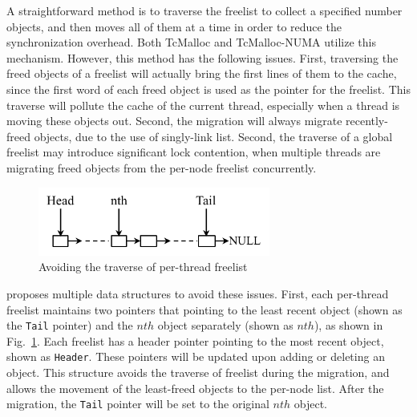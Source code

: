 
A straightforward method is to traverse the freelist to collect a specified number objects, and then moves all of them at a time in order to reduce the synchronization overhead. Both TcMalloc and TcMalloc-NUMA utilize this mechanism. However, this method has the following issues. First, traversing the freed objects of a freelist will actually bring the first lines of them to the cache, since the first word of each freed object is used as the pointer for the freelist. This traverse will pollute the cache of the current thread, especially when a thread is moving these objects out. 
Second, the migration will always migrate recently-freed objects, due to the use of singly-link list. 
Second, the traverse of a global freelist may introduce significant lock contention, when multiple threads are migrating freed objects from the per-node freelist concurrently.

\begin{figure}[!h]
\centering
\includegraphics[width=3in]{figure/perthreadlist}
\vspace{-0.1in}
\caption{Avoiding the traverse of per-thread freelist\label{fig:perthreadlist}}
\vspace{-0.1in}
\end{figure}

\NM{} proposes multiple data structures to avoid these issues. First, each per-thread freelist maintains two pointers that pointing to the least recent object (shown as the \texttt{Tail} pointer) and the $nth$ object separately (shown as $nth$), as shown in Fig.~\ref{fig:perthreadlist}. Each freelist has a header pointer pointing to the most recent object, shown as \texttt{Header}. These pointers will be updated upon adding or deleting an object. This structure avoids the traverse of freelist during the migration, and allows the movement of the least-freed objects to the per-node list. After the migration, the \texttt{Tail} pointer will be set to the original $nth$ object. 

